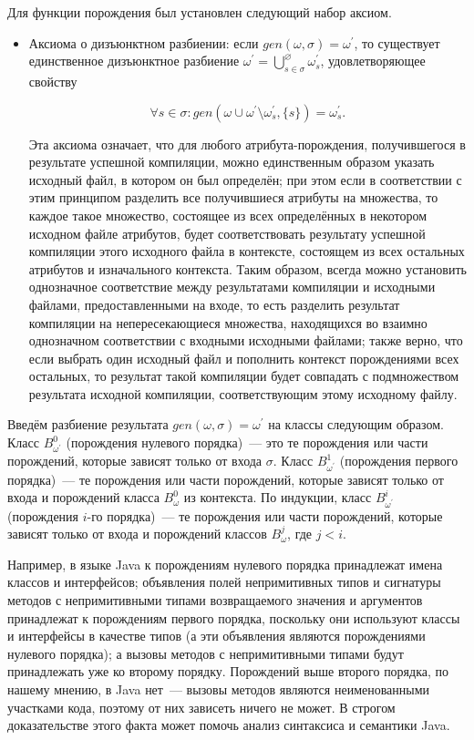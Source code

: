 Для функции порождения был установлен следующий набор аксиом.

\begin{itemize}
	\item Аксиома о дизъюнктном разбиении: если $gen(\omega,\sigma) = \omega^\prime$, то существует единственное дизъюнктное разбиение $\omega^\prime=\bigcup^\varnothing_{s\in\sigma}\omega^\prime_s$, 
	удовлетворяющее свойству 

	$$\forall s\in\sigma : gen(\omega\cup\omega^\prime\setminus\omega^\prime_s,\{s\})=\omega^\prime_s.$$
	
	Эта аксиома означает, что для любого атрибута-порождения, получившегося в результате успешной компиляции, можно единственным образом указать исходный файл, в котором он был определён; при этом если в соответствии с этим принципом разделить все получившиеся атрибуты на множества, то каждое такое множество, состоящее из всех определённых в некотором исходном файле атрибутов, будет соответствовать результату успешной компиляции этого исходного файла в контексте, состоящем из всех остальных атрибутов и изначального контекста. Таким образом, всегда можно установить однозначное соответствие между результатами компиляции и исходными файлами, предоставленными на входе, то есть разделить результат компиляции на непересекающиеся множества, находящихся во взаимно однозначном соответствии с входными исходными файлами; также верно, что если выбрать один исходный файл и пополнить контекст порождениями всех остальных, то результат такой компиляции будет совпадать с подмножеством результата исходной компиляции, соответствующим этому исходному файлу.
\end{itemize}

Введём разбиение результата $gen(\omega, \sigma) = \omega^\prime$ на классы следующим образом. Класс $B^0_{\omega^\prime}$ (порождения нулевого порядка)~--- это те порождения или части порождений, которые зависят только от входа $\sigma$. Класс $B^1_{\omega^\prime}$ (порождения первого порядка)~--- те порождения или части порождений, которые зависят только от входа и порождений класса $B^0_{\omega}$ из контекста. По индукции, класс $B^i_{\omega^\prime}$ (порождения $i$-го порядка)~--- те порождения или части порождений, которые зависят только от входа и порождений классов $B^j_{\omega}$, где $j < i$.

Например, в языке Java к порождениям нулевого порядка принадлежат имена классов и интерфейсов; объявления полей непримитивных типов и сигнатуры методов с непримитивными типами возвращаемого значения и аргументов принадлежат к порождениям первого порядка, поскольку они используют классы и интерфейсы в качестве типов (а эти объявления являются порождениями нулевого порядка); а вызовы методов с непримитивными типами будут принадлежать уже ко второму порядку. Порождений выше второго порядка, по нашему мнению, в Java нет~--- вызовы методов являются неименованными участками кода, поэтому от них зависеть ничего не может. В строгом доказательстве этого факта может помочь анализ синтаксиса и семантики Java.


